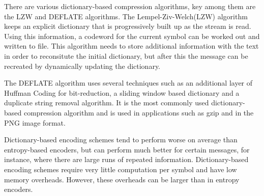 \documentclass[a4paper,11pt]{report}
\begin{document}
There are various dictionary-based compression algorithms, key among them are the LZW and DEFLATE algorithms. The Lempel-Ziv-Welch(LZW) algorithm keeps an explicit dictionary that is progressively built up as the stream is read.\cite{1320134} Using this information, a codeword for the current symbol can be worked out and written to file. This algorithm needs to store additional information with the text in order to reconsitute the initial dictionary, but after this the message can be recreated by dynamically updating the dictionary. 

The DEFLATE algorithm uses several techniques such as an additional layer of Huffman Coding for bit-reduction, a sliding window based dictionary and a duplicate string removal algorithm\cite{deflaterfc}. It is the most commonly used dictionary-based compression algorithm and is used in applications such as gzip and in the PNG image format. 

Dictionary-based encoding schemes tend to perform worse on average than entropy-based encoders, but can perform much better for certain messages, for instance, where there are large runs of repeated information. Dictionary-based encoding schemes require very little computation per symbol and have low memory overheads. However, these overheads can be larger than in entropy encoders. 
\end{document}
